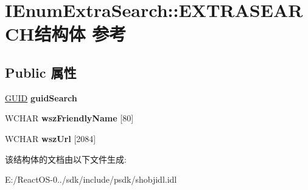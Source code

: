 \hypertarget{struct_i_enum_extra_search_1_1_e_x_t_r_a_s_e_a_r_c_h}{}\section{I\+Enum\+Extra\+Search\+:\+:E\+X\+T\+R\+A\+S\+E\+A\+R\+C\+H结构体 参考}
\label{struct_i_enum_extra_search_1_1_e_x_t_r_a_s_e_a_r_c_h}
\subsection*{Public 属性}
\begin{DoxyCompactItemize}
\item 
\mbox{\label{struct_i_enum_extra_search_1_1_e_x_t_r_a_s_e_a_r_c_h_a1e2443135c1ebb8b0360aa8ce73b7624}} 
\hyperlink{interface_g_u_i_d}{G\+U\+ID} {\bfseries guid\+Search}
\item 
\mbox{\label{struct_i_enum_extra_search_1_1_e_x_t_r_a_s_e_a_r_c_h_a96aa2b52e244eabb89b041c3d36048c3}} 
W\+C\+H\+AR {\bfseries wsz\+Friendly\+Name} \mbox{[}80\mbox{]}
\item 
\mbox{\label{struct_i_enum_extra_search_1_1_e_x_t_r_a_s_e_a_r_c_h_a5588a30d42edd37c94f01438cdcb5d4c}} 
W\+C\+H\+AR {\bfseries wsz\+Url} \mbox{[}2084\mbox{]}
\end{DoxyCompactItemize}


该结构体的文档由以下文件生成\+:\begin{DoxyCompactItemize}
\item 
E\+:/\+React\+O\+S-\/0../sdk/include/psdk/shobjidl.\+idl\end{DoxyCompactItemize}
